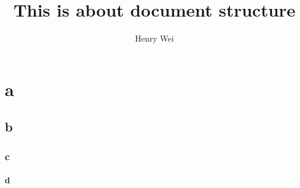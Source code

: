 \documentclass{book}
\begin{document}
\title{This is about document structure}

\author{Henry Wei}

\date{}

\maketitle	


\tableofcontents

\mainmatter

\part{a}
\chapter{b}
\section{c}
\subsection{d}
\end{document}
